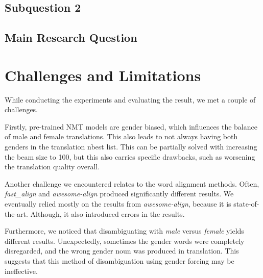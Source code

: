 \subsection{Subquestion 2} %
\label{sec:Discussion:Answers:2}

\subsection{Main Research Question} %
\label{sec:Discussion:Answers:Main}


\section{Challenges and Limitations}
\label{sec:Discussion:Challenges}

While conducting the experiments and evaluating the result, we met a couple of challenges.

Firstly, pre-trained NMT models are gender biased, which influences the balance of male and female translations. This also leads to not always having both genders in the translation nbest list. This can be partially solved with increasing the beam size to 100, but this also carries specific drawbacks, such as worsening the translation quality overall.

Another challenge we encountered relates to the word alignment methods. Often, \textit{fast\_align} and \textit{awesome-align} produced significantly different results. We eventually relied mostly on the results from \textit{awesome-align}, because it is state-of-the-art. Although, it also introduced errors in the results.

Furthermore, we noticed that disambiguating with \textit{male} versus \textit{female} yields different results. Unexpectedly, sometimes the gender words were completely disregarded, and the wrong gender noun was produced in translation. This suggests that this method of disambiguation using gender forcing may be ineffective.


